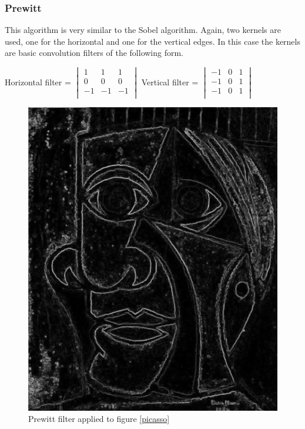 \documentclass[12pt]{article}
\begin{document}
\subsubsection{Prewitt}
This algorithm is very similar to the Sobel algorithm. Again, two kernels are used, one for the horizontal and one for the vertical edges. In this case the kernels are basic convolution filters of the following form. 
\newline

Horizontal filter = $\begin{vmatrix}
        1 & 1 & 1\\
        0 & 0 & 0\\
        -1 & -1 & -1\\
\end{vmatrix}$\hspace{11mm}
Vertical filter = $\begin{vmatrix}
        -1 & 0 & 1\\
        -1 & 0 & 1\\
        -1 & 0 & 1\\
\end{vmatrix}$
\newline

\begin{figure}[h]
\centering
\includegraphics[scale = 0.39]{img/picassoPrewitt}
\caption{Prewitt filter applied to figure \ref{picasso}}
\label{prewitt}
\end{figure}
\newpage
\end{document}
